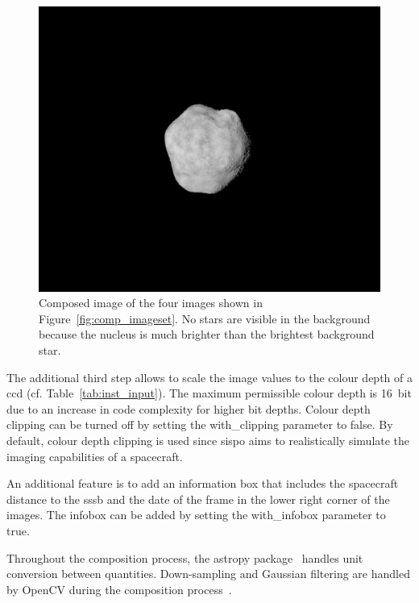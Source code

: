 \begin{figure}[htb]
    \centering
    \includegraphics[width=\textwidth]{doc/thesis/0_figures/composition/Comp_2017-08-15T115854-575000.png}
    \caption{Composed image of the four images shown in Figure~\ref{fig:comp_imageset}. No stars are visible in the background because the nucleus is much brighter than the brightest background star.}
    \label{fig:comp_composed}
\end{figure}

The additional third step allows to scale the image values to the colour depth of a \gls{ccd} (cf. Table~\ref{tab:inst_input}). The maximum permissible colour depth is \SI{16}{bit} due to an increase in code complexity for higher bit depths. Colour depth clipping can be turned off by setting the with\_clipping parameter to false. By default, colour depth clipping is used since \gls{sispo} aims to realistically simulate the imaging capabilities of a spacecraft.

An additional feature is to add an information box that includes the spacecraft distance to the \gls{sssb} and the date of the frame in the lower right corner of the images. The infobox can be added by setting the with\_infobox parameter to true.

Throughout the composition process, the astropy package~\cite{robitaille2013astropy, price2018astropy} handles unit conversion between quantities. Down-sampling and Gaussian filtering are handled by OpenCV during the composition process~\cite{opencv_library}.

